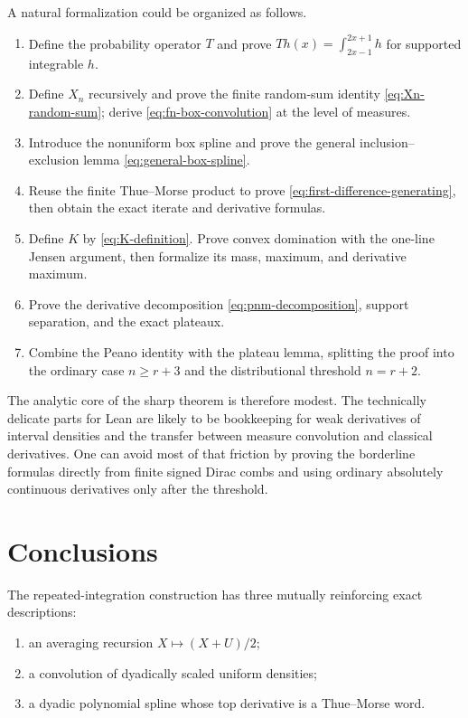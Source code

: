\documentclass[11pt,oneside]{article}
\theoremstyle{definition}
\theoremstyle{remark}
\begin{document}
A natural formalization could be organized as follows.

\begin{enumerate}[label=\textup{(\arabic*)}]
\item Define the probability operator $T$ and prove
$Th(x)=\int_{2x-1}^{2x+1}h$ for supported integrable $h$.
\item Define $X_n$ recursively and prove the finite random-sum identity
\eqref{eq:Xn-random-sum}; derive \eqref{eq:fn-box-convolution} at the level of measures.
\item Introduce the nonuniform box spline and prove the general inclusion--exclusion lemma
\eqref{eq:general-box-spline}.
\item Reuse the finite Thue--Morse product to prove
\eqref{eq:first-difference-generating}, then obtain the exact iterate and derivative formulas.
\item Define $K$ by \eqref{eq:K-definition}.  Prove convex domination with the one-line
Jensen argument, then formalize its mass, maximum, and derivative maximum.
\item Prove the derivative decomposition \eqref{eq:pnm-decomposition}, support separation,
and the exact plateaux.
\item Combine the Peano identity with the plateau lemma, splitting the proof into the
ordinary case $n\ge r+3$ and the distributional threshold $n=r+2$.
\end{enumerate}

The analytic core of the sharp theorem is therefore modest.  The technically delicate
parts for Lean are likely to be bookkeeping for weak derivatives of interval densities and
the transfer between measure convolution and classical derivatives.  One can avoid most
of that friction by proving the borderline formulas directly from finite signed Dirac
combs and using ordinary absolutely continuous derivatives only after the threshold.

\section{Conclusions}
\label{sec:conclusion}

The repeated-integration construction has three mutually reinforcing exact descriptions:

\begin{enumerate}[label=\textup{(\roman*)}]
\item an averaging recursion $X\mapsto(X+U)/2$;
\item a convolution of dyadically scaled uniform densities;
\item a dyadic polynomial spline whose top derivative is a Thue--Morse word.
\end{enumerate}
\end{document}
